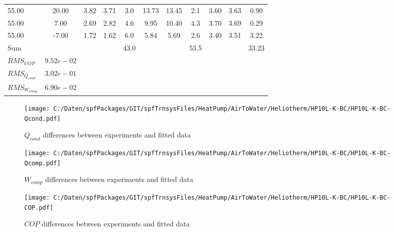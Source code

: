 \documentclass[english]{SPFShortReport}
\begin{document}
\begin{table}[!ht]
\begin{small}
\begin{center}
{\begin{tabular}{l | c c c c c c c c c c }
55.00  & 20.00 & 3.82 & 3.71 & 3.0 & 13.73 & 13.45 & 2.1 & 3.60 & 3.63 & 0.90\\ 
55.00  & 7.00 & 2.69 & 2.82 & 4.6 & 9.95 & 10.40 & 4.3 & 3.70 & 3.69 & 0.29\\ 
55.00  & -7.00 & 1.72 & 1.62 & 6.0 & 5.84 & 5.69 & 2.6 & 3.40 & 3.51 & 3.22\\ 
\hline 
 Sum &  & &  & 43.0 &  &  & 53.5 & &  & 33.23\\ 
\hline 
 $RMS_{COP}$ & $9.52e-02$ \\ 
 $RMS_{Q_{cond}}$ & $3.02e-01$ \\ 
 $RMS_{W_{comp}}$ & $6.90e-02$ \\ 
\hline
\hline
\end{tabular}
}
\label{ErrorsTable}
\end{center}
\end{small}
\end{table}
\begin{figure}[!ht]
\begin{center}
\texttt{[image: C:/Daten/spfPackages/GIT/spfTrnsysFiles/HeatPump/AirToWater/Heliotherm/HP10L-K-BC/HP10L-K-BC-Qcond.pdf]}
\caption{$Q_{cond}$ differences between experiments and fitted data}
\label{QcongFig}
\end{center}
\end{figure}
\begin{figure}[!ht]
\begin{center}
\texttt{[image: C:/Daten/spfPackages/GIT/spfTrnsysFiles/HeatPump/AirToWater/Heliotherm/HP10L-K-BC/HP10L-K-BC-Qcomp.pdf]}
\caption{$W_{comp}$ differences between experiments and fitted data}
\label{QcompFig}
\end{center}
\end{figure}
\begin{figure}[!ht]
\begin{center}
\texttt{[image: C:/Daten/spfPackages/GIT/spfTrnsysFiles/HeatPump/AirToWater/Heliotherm/HP10L-K-BC/HP10L-K-BC-COP.pdf]}
\caption{$COP$ differences between experiments and fitted data}
\label{COPFig}
\end{center}
\end{figure}
\end{document}
